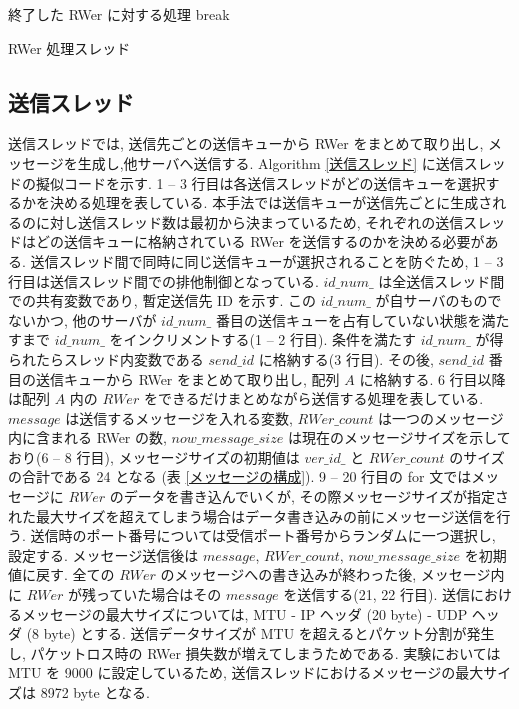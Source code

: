 \begin{algorithm}[p]
{{{{{{\nl                         終了した RWer に対する処理\;
\nl                         break\;}
\nl                     {}}}}}}
\caption{{RWer 処理スレッド} \label{RWer 処理スレッド}}
\end{algorithm}

\subsection{送信スレッド}\label{sub:送信スレッド}

送信スレッドでは, 送信先ごとの送信キューから RWer をまとめて取り出し, メッセージを生成し,他サーバへ送信する. Algorithm \ref{送信スレッド} に送信スレッドの擬似コードを示す. 1 -- 3 行目は各送信スレッドがどの送信キューを選択するかを決める処理を表している. 本手法では送信キューが送信先ごとに生成されるのに対し送信スレッド数は最初から決まっているため, それぞれの送信スレッドはどの送信キューに格納されている RWer を送信するのかを決める必要がある. 送信スレッド間で同時に同じ送信キューが選択されることを防ぐため, 1 -- 3 行目は送信スレッド間での排他制御となっている. $id\_num\_$ は全送信スレッド間での共有変数であり, 暫定送信先 ID を示す. この $id\_num\_$ が自サーバのものでないかつ, 他のサーバが $id\_num\_$ 番目の送信キューを占有していない状態を満たすまで $id\_num\_$ をインクリメントする(1 -- 2 行目). 条件を満たす $id\_num\_$ が得られたらスレッド内変数である $send\_id$ に格納する(3 行目). その後, $send\_id$ 番目の送信キューから RWer をまとめて取り出し, 配列 $A$ に格納する. 6 行目以降は配列 $A$ 内の $RWer$ をできるだけまとめながら送信する処理を表している. $message$ は送信するメッセージを入れる変数, $RWer\_count$ は一つのメッセージ内に含まれる RWer の数, $now\_message\_size$ は現在のメッセージサイズを示しており(6 -- 8 行目), メッセージサイズの初期値は $ver\_id\_$ と $RWer\_count$ のサイズの合計である 24 となる (表 \ref{メッセージの構成}). 9 -- 20 行目の for 文ではメッセージに $RWer$ のデータを書き込んでいくが, その際メッセージサイズが指定された最大サイズを超えてしまう場合はデータ書き込みの前にメッセージ送信を行う. 送信時のポート番号については受信ポート番号からランダムに一つ選択し, 設定する. メッセージ送信後は $message$, $RWer\_count$, $now\_message\_size$ を初期値に戻す. 全ての $RWer$ のメッセージへの書き込みが終わった後, メッセージ内に $RWer$ が残っていた場合はその $message$ を送信する(21, 22 行目). 送信におけるメッセージの最大サイズについては, MTU - IP ヘッダ (20 byte) - UDP ヘッダ (8 byte) とする. 送信データサイズが MTU を超えるとパケット分割が発生し, パケットロス時の RWer 損失数が増えてしまうためである. 実験においては MTU を 9000 に設定しているため, 送信スレッドにおけるメッセージの最大サイズは 8972 byte となる. 

